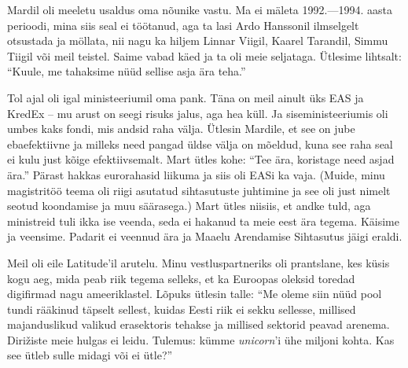 
Mardil oli meeletu usaldus oma nõunike vastu. Ma ei mäleta 1992.---1994. aasta 
perioodi, mina siis seal ei töötanud, aga ta lasi Ardo 
Hanssonil ilmselgelt otsustada ja möllata, nii nagu 
ka hiljem Linnar Viigil, Kaarel 
Tarandil, Simmu Tiigil 
või meil teistel. Saime vabad käed ja ta oli meie seljataga. Ütlesime lihtsalt: \enquote{Kuule, me tahaksime nüüd sellise asja ära 
teha.} 

Tol ajal oli igal ministeeriumil oma pank. Täna on meil 
ainult üks EAS ja KredEx -- mu arust on seegi risuks jalus, aga hea küll. 
Ja siseministeeriumis oli umbes kaks fondi, mis andsid raha 
välja. Ütlesin Mardile, et see on jube ebaefektiivne ja 
milleks need pangad üldse välja on mõeldud, kuna see raha 
seal ei kulu just kõige efektiivsemalt. Mart ütles kohe: \enquote{Tee ära, 
koristage need asjad ära.} Pärast hakkas eurorahasid liikuma ja siis oli 
EASi ka vaja. (Muide, minu magistritöö teema oli riigi asutatud 
sihtasutuste juhtimine ja see oli just nimelt seotud koondamise ja muu säärasega.) Mart ütles niisiis, et andke tuld, aga ministreid tuli ikka 
ise veenda, seda ei hakanud ta meie eest ära tegema. Käisime ja veensime. Padarit ei veennud ära ja Maaelu 
Arendamise Sihtasutus jäigi eraldi.


Meil oli eile Latitude'il arutelu. Minu vestluspartneriks oli prantslane, kes küsis 
kogu aeg, mida peab riik tegema selleks, et ka Euroopas oleksid toredad digifirmad nagu ameeriklastel. Lõpuks
ütlesin talle: \enquote{Me oleme siin nüüd pool tundi rääkinud täpselt sellest, 
kuidas Eesti riik ei sekku sellesse, millised majanduslikud valikud 
erasektoris tehakse ja millised sektorid peavad arenema. 
Dirižiste meie hulgas ei leidu. Tulemus: kümme
\emph{unicorn}'i ühe miljoni kohta. Kas see ütleb sulle midagi või ei ütle?} 

